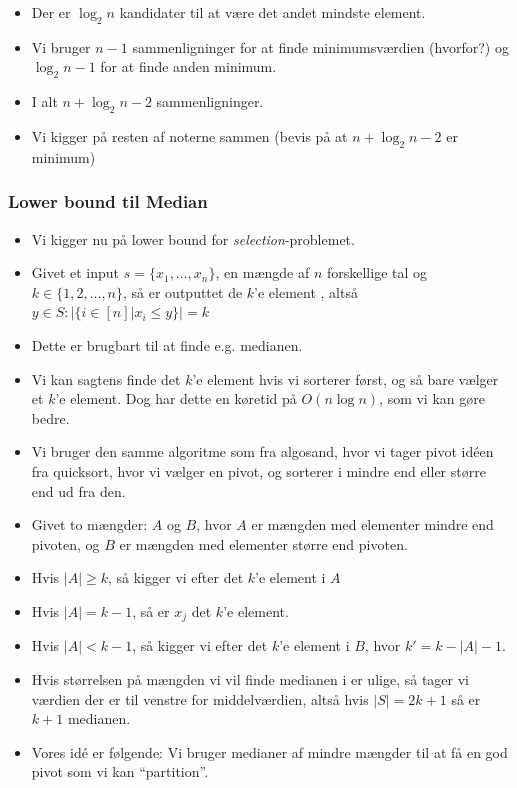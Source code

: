 \begin{frame}[allowframebreaks]
\begin{itemize}
		\item Der er $\log_{2}n$ kandidater til at være det andet mindste element.
		\item Vi bruger $n-1$ sammenligninger for at finde minimumsværdien (hvorfor?) og $\log_{2}n-1$ for at finde anden minimum.
		\item I alt $n+\log_{2}n-2$ sammenligninger.
		\item Vi kigger på resten af noterne sammen (bevis på at $n + \log_{2}n-2$ er minimum)
	\end{itemize}
\end{frame}

\begin{frame}[allowframebreaks]
	\frametitle{Lower bound til Median}

	\begin{itemize}
		\item Vi kigger nu på lower bound for \textit{selection}-problemet.
		\item Givet et input $s = \{x_{1}, \ldots, x_{n}\}$, en mængde af $n$ forskellige tal og $k \in \{1 , 2, \ldots, n\}$, så er outputtet de $k$'e element , altså $y \in S : |\{i \in [n] | x_{i} \le y\}| = k$
		\item Dette er brugbart til at finde e.g. medianen.
		\item Vi kan sagtens finde det $k$'e element hvis vi sorterer først, og så bare vælger et $k$'e element. Dog har dette en køretid på $O(n \log n)$, som vi kan gøre bedre.
		\item Vi bruger den samme algoritme som fra algosand, hvor vi tager pivot idéen fra quicksort, hvor vi vælger en pivot, og sorterer i mindre end eller større end ud fra den.
		\item Givet to mængder: $A$ og $B$, hvor $A$ er mængden med elementer mindre end pivoten, og $B$ er mængden med elementer større end pivoten.
		\item Hvis $|A| \ge k$, så kigger vi efter det $k$'e element i $A$
		\item Hvis $|A| = k-1$, så er $x_{j}$ det $k$'e element.
		\item Hvis $|A| < k-1$, så kigger vi efter det $k$'e element i $B$, hvor $k' = k - |A| - 1$.
		\item Hvis størrelsen på mængden vi vil finde medianen i er ulige, så tager vi værdien der er til venstre for middelværdien, altså hvis $|S| = 2k+1$ så er $k+1$ medianen.
		\item Vores idé er følgende: Vi bruger medianer af mindre mængder til at få en god pivot som vi kan ``partition''.

\end{itemize}
\end{frame}
